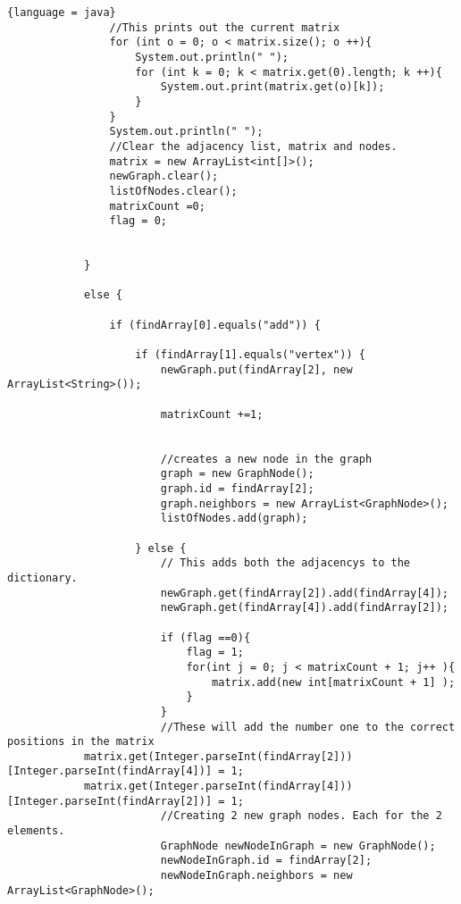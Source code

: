 \documentclass{article}
\begin{document}
\begin{lstlisting}{language = java}
                //This prints out the current matrix
                for (int o = 0; o < matrix.size(); o ++){
                    System.out.println(" ");
                    for (int k = 0; k < matrix.get(0).length; k ++){
                        System.out.print(matrix.get(o)[k]);
                    }
                }
                System.out.println(" ");
                //Clear the adjacency list, matrix and nodes.
                matrix = new ArrayList<int[]>();
                newGraph.clear();
                listOfNodes.clear();
                matrixCount =0;
                flag = 0;

                
            }

            else {

                if (findArray[0].equals("add")) {

                    if (findArray[1].equals("vertex")) {
                        newGraph.put(findArray[2], new ArrayList<String>());

                        matrixCount +=1;
                        

                        //creates a new node in the graph
                        graph = new GraphNode();
                        graph.id = findArray[2];
                        graph.neighbors = new ArrayList<GraphNode>();
                        listOfNodes.add(graph);
                        
                    } else {
                        // This adds both the adjacencys to the dictionary.
                        newGraph.get(findArray[2]).add(findArray[4]);
                        newGraph.get(findArray[4]).add(findArray[2]);
                        
                        if (flag ==0){
                            flag = 1;
                            for(int j = 0; j < matrixCount + 1; j++ ){
                                matrix.add(new int[matrixCount + 1] );
                            }
                        }
                        //These will add the number one to the correct positions in the matrix
            matrix.get(Integer.parseInt(findArray[2]))[Integer.parseInt(findArray[4])] = 1;
            matrix.get(Integer.parseInt(findArray[4]))[Integer.parseInt(findArray[2])] = 1;
                        //Creating 2 new graph nodes. Each for the 2 elements.
                        GraphNode newNodeInGraph = new GraphNode();
                        newNodeInGraph.id = findArray[2];
                        newNodeInGraph.neighbors = new ArrayList<GraphNode>();


\end{lstlisting}
\end{document}
